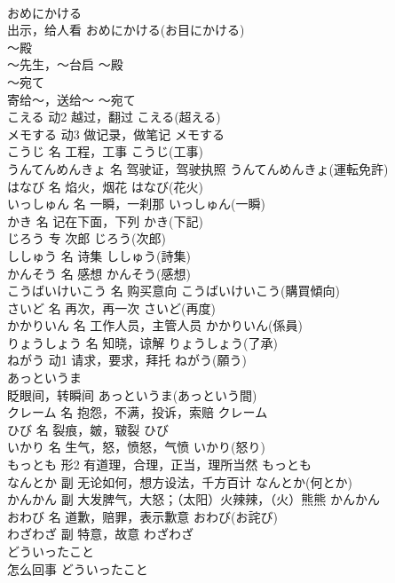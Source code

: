 \documentclass[8pt]{extreport}
\begin{document}
\begin{CJK}{UTF8}{min}
\\	おめにかける	
\\	出示，给人看	おめにかける(お目にかける)	
\\	～殿	
\\	～先生，～台启	～殿	
\\	～宛て	
\\	寄给～，送给～	～宛て	
\\	こえる	动2	越过，翻过	こえる(超える)	
\\	メモする	动3	做记录，做笔记	メモする	
\\	こうじ	名	工程，工事	こうじ(工事)	
\\	うんてんめんきょ	名	驾驶证，驾驶执照	うんてんめんきょ(運転免許)	
\\	はなび	名	焰火，烟花	はなび(花火)	
\\	いっしゅん	名	一瞬，一刹那	いっしゅん(一瞬)	
\\	かき	名	记在下面，下列	かき(下記)	
\\	じろう	专	次郎	じろう(次郎)	
\\	ししゅう	名	诗集	ししゅう(詩集)	
\\	かんそう	名	感想	かんそう(感想)	
\\	こうばいけいこう	名	购买意向	こうばいけいこう(購買傾向)	
\\	さいど	名	再次，再一次	さいど(再度)	
\\	かかりいん	名	工作人员，主管人员	かかりいん(係員)	
\\	りょうしょう	名	知晓，谅解	りょうしょう(了承)	
\\	ねがう	动1	请求，要求，拜托	ねがう(願う)	
\\	あっというま	
\\	眨眼间，转瞬间	あっというま(あっという間)	
\\	クレーム	名	抱怨，不满，投诉，索赔	クレーム	
\\	ひび	名	裂痕，皴，皲裂	ひび	
\\	いかり	名	生气，怒，愤怒，气愤	いかり(怒り)	
\\	もっとも	形2	有道理，合理，正当，理所当然	もっとも	
\\	なんとか	副	无论如何，想方设法，千方百计	なんとか(何とか)	
\\	かんかん	副	大发脾气，大怒；（太阳）火辣辣，（火）熊熊	かんかん	
\\	おわび	名	道歉，赔罪，表示歉意	おわび(お詫び)	
\\	わざわざ	副	特意，故意	わざわざ	
\\	どういったこと	
\\	怎么回事	どういったこと	

\end{CJK}
\end{document}
